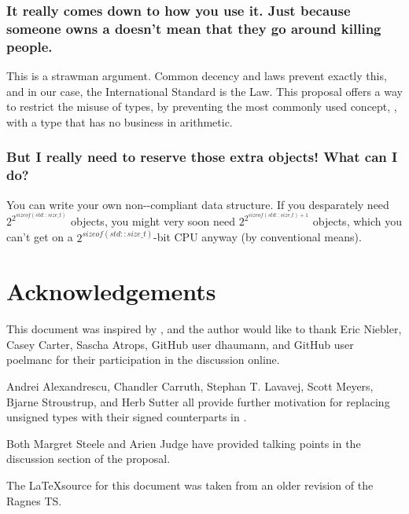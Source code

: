 \subsubsection*{It really comes down to how you use it. Just because someone owns a
 doesn't mean that they go around killing people.}
This is a strawman argument. Common decency and laws prevent exactly this, and in our case, the
International Standard is the Law. This proposal offers a way to restrict the misuse of types, by
preventing the most commonly used concept, , with a type that has no business
in arithmetic.

\subsubsection*{But I really need to reserve those extra objects! What can I do?}
You can write your own non--compliant data structure. If you desparately need
$2^{2^{sizeof(std::size\_t)}}$ objects, you might very soon need $2^{2^{sizeof(std::size\_t) + 1}}$
objects, which you can't get on a $2^{sizeof(std::size\_t)}$-bit CPU anyway (by conventional
means)\cite{niebler16}.

\section*{Acknowledgements}
This document was inspired by \cite{niebler16}, and the author would like to thank Eric Niebler,
Casey Carter, Sascha Atrops, GitHub user dhaumann, and GitHub user poelmanc for their participation
in the discussion online.

Andrei Alexandrescu, Chandler Carruth, Stephan T. Lavavej, Scott Meyers, Bjarne Stroustrup, and Herb
Sutter all provide further motivation for replacing unsigned types with their signed counterparts in
\cite{panel}.

Both Margret Steele and Arien Judge have provided talking points in the discussion section of the
proposal.

The \LaTeX source for this document was taken from an older revision of the Ragnes TS.

